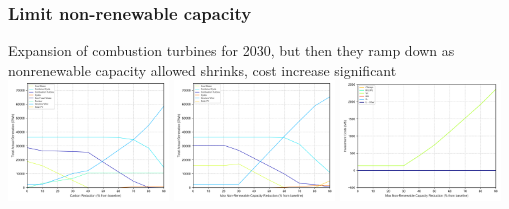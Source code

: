 \documentclass[xcolor=dvipsnames]{beamer}
\begin{document}
%
%


\begin{frame}
  \frametitle{Limit non-renewable capacity}
  Expansion of combustion turbines for 2030, but then they ramp down
  as nonrenewable capacity allowed shrinks, cost increase significant\\
  \includegraphics[width=0.32\textwidth]{includes/no_leakage_shutdowns_agg_generation_cntlreg.png}
  \includegraphics[width=0.32\textwidth]{includes/no_leakage_maxNR_agg_generation_cntlreg.png}
  \includegraphics[width=0.32\textwidth]{includes/no_leakage_maxNR_invest_costs_by_region.png}
\end{frame}
\end{document}
